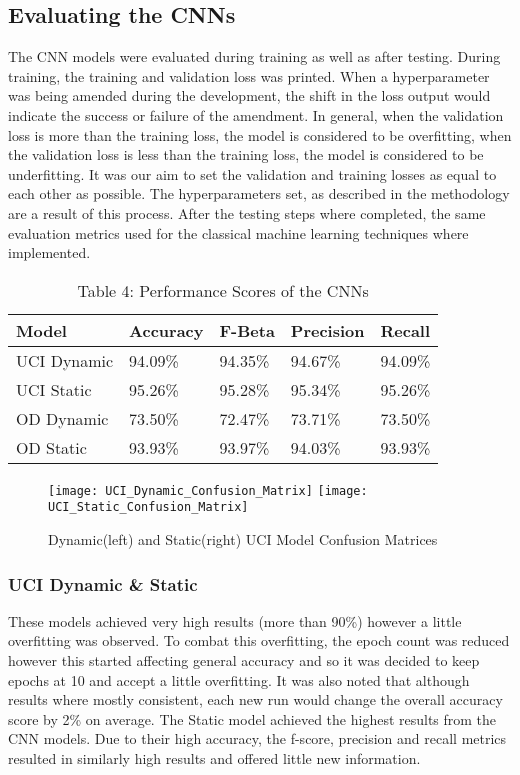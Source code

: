 \subsection{Evaluating the CNNs}
The CNN models were evaluated during training as well as after testing.
During training, the training and validation loss was printed.
When a hyperparameter was being amended during the development, the shift in the loss output would indicate the success or failure of the amendment.
In general, when the validation loss is more than the training loss, the model is considered to be overfitting, when the validation loss is less than the training loss, the model is considered to be underfitting.
It was our aim to set the validation and training losses as equal to each other as possible.
The hyperparameters set, as described in the methodology are a result of this process.
After the testing steps where completed, the same evaluation metrics used for the classical machine learning techniques where implemented.

\begin{table}[ht]
    \centering\scriptsize
    \begin{tabular}{|l|l|l|l|l|}
        \hline
        \textbf{Model} & \textbf{Accuracy} & \textbf{F-Beta}  & \textbf{Precision} & \textbf{Recall} \\ \hline
        UCI Dynamic             & 94.09\%           & 94.35\%  & 94.67\% & 94.09\% \\ \hline
        UCI Static            & 95.26\%           & 95.28\% & 95.34\% & 95.26\% \\ \hline
        OD Dynamic               & 73.50\%           & 72.47\% & 73.71\% & 73.50\% \\ \hline
        OD Static            & 93.93\%           & 93.97\% & 94.03\% & 93.93\% \\ \hline
    \end{tabular}
    \caption*{Table 4: Performance Scores of the CNNs}
\end{table}

\begin{figure}[H]
\centering
\texttt{[image: UCI\_Dynamic\_Confusion\_Matrix]}\hfill
\texttt{[image: UCI\_Static\_Confusion\_Matrix]}\hfill
\caption{Dynamic(left) and Static(right) UCI Model Confusion Matrices}
\label{fig:UCI_Confusions}
\end{figure}

\subsubsection{UCI Dynamic \& Static}
These models achieved very high results (more than 90\%) however a little overfitting was observed.
To combat this overfitting, the epoch count was reduced however this started affecting general accuracy and so it was decided to keep epochs at 10 and accept a little overfitting.
It was also noted that although results where mostly consistent, each new run would change the overall accuracy score by 2\% on average.
The Static model achieved the highest results from the CNN models.
Due to their high accuracy, the f-score, precision and recall metrics resulted in similarly high results and offered little new information.

